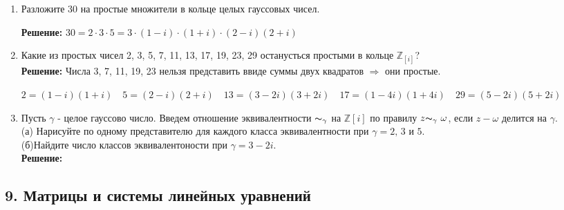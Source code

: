 \documentclass[]{book}
\theoremstyle{definition}
\newcommand{\bb}[1]{\mathbb{#1}}
\begin{document}
\begin{enumerate}[resume]

\item Разложите 30 на простые множители в кольце целых гауссовых чисел.

\textbf{Решение:}
$30=2\cdot3\cdot5 = 3\cdot{(1-{i})\cdot(1+{i})}\cdot{(2-{i})(2+{i})}$

\item Какие из простых чисел 2, 3, 5, 7, 11, 13, 17, 19, 23, 29 останусться простыми в кольце $\bb{Z}_{[i]}$?\\

\textbf{Решение:}
Числа 3, 7, 11, 19, 23 нельзя представить ввиде суммы двух квадратов $\Rightarrow$ они простые. 

$2=(1-i)(1+i)\quad 5=(2-i)(2+i)\quad 13=(3-2i)(3+2i)\quad 17=(1-4i)(1+4i)\quad 29=(5-2i)(5+2i)$


\item Пусть $\gamma$	- целое гауссово число. Введем отношение эквивалентности ${\thicksim}_{\gamma}$ на $\bb{Z}[i]$ по правилу $z{\thicksim}_{\gamma}\ \omega$, если $z - \omega$ делится на $\gamma$.\\
(а) Нарисуйте по одному представителю для каждого класса эквивалентности при $\gamma = 2\text{, }3 \text{ и } 5$.\\
(б)Найдите число классов эквивалентоности при $\gamma = 3-2i$.\\
\textbf{Решение:}

\end{enumerate}

\subsection*{9. Матрицы и системы линейных уравнений}
\end{document}
